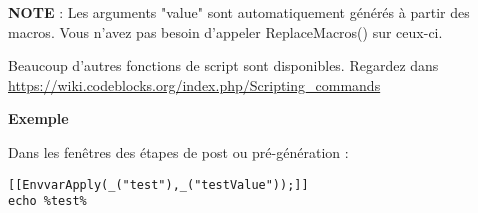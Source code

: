 \textbf{NOTE} : Les arguments "value" sont automatiquement générés à partir des macros. Vous n'avez pas besoin d'appeler ReplaceMacros() sur ceux-ci.

Beaucoup d'autres fonctions de script sont disponibles. Regardez dans \url{https://wiki.codeblocks.org/index.php/Scripting_commands}

\textbf{Exemple}

Dans les fenêtres des étapes de post ou pré-génération :
\begin{lstlisting}
[[EnvvarApply(_("test"),_("testValue"));]]
echo %test%
\end{lstlisting}

